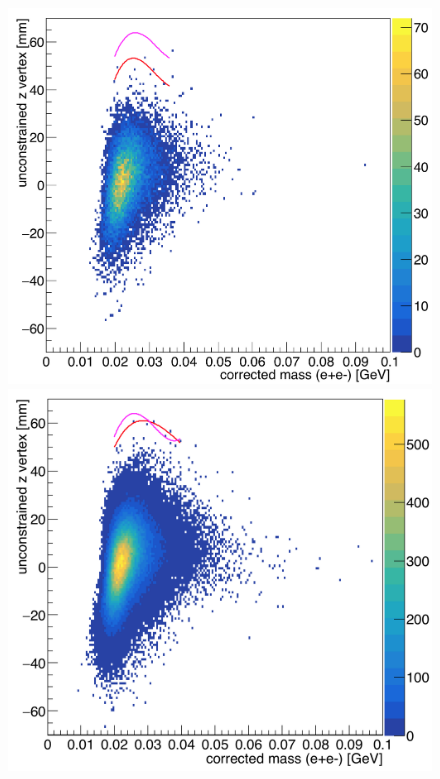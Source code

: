 \begin{figure}[hbt]
\begin{minipage}{0.5\textwidth}
 \includegraphics[width=\textwidth]{pics/appendix/zVm_L2L2_1p5_bl.png}
\end{minipage}\hfill\begin{minipage}{0.5\textwidth}
 \includegraphics[width=\textwidth]{pics/appendix/zVm_L2L2_1p5_ub.png}
 \end{minipage}

\end{figure}
